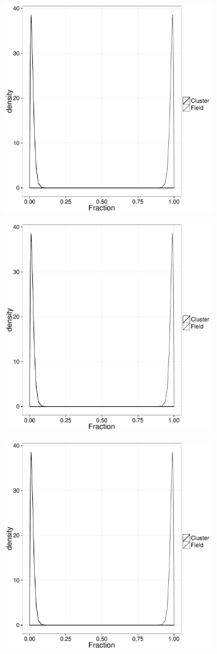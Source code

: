 \begin{figure}[ht!]
    \centering
    \begin{subfigure}[t]{0.48\textwidth}
        \includegraphics[page=1,height=9cm,width=\textwidth]{background/Figures/Priors.pdf}
        \caption{}
    \end{subfigure}
    \begin{subfigure}[t]{0.48\textwidth}
      \includegraphics[page=2,height=9cm,width=\textwidth]{background/Figures/Priors.pdf}
        \caption{}
    \end{subfigure}
     \begin{subfigure}[t]{0.48\textwidth}
      \includegraphics[page=3,height=9cm,width=\textwidth]{background/Figures/Priors.pdf}

\end{subfigure}
\end{figure}
